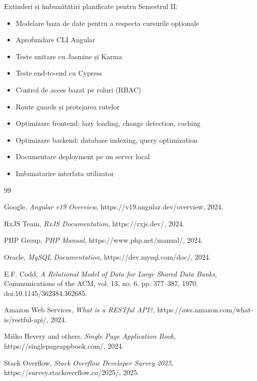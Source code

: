 \documentclass[conference]{IEEEtran}
\begin{document}
Extinderi și îmbunătățiri planificate pentru Semestrul II:

\begin{itemize}
    \item Modelare baza de date pentru a respecta cursurile opționale
    \item Aprofundare CLI Angular
    \item Teste unitare cu Jasmine și Karma
    \item Teste end-to-end cu Cypress
    \item Control de acces bazat pe roluri (RBAC)
    \item Route guards și protejarea rutelor
    \item Optimizare frontend: lazy loading, change detection, caching
    \item Optimizare backend: database indexing, query optimization
    \item Documentare deployment pe un server local
    \item Imbunatarire interfata utilizator
\end{itemize}
\begin{thebibliography}{99}

    Google, \textit{Angular v19 Overview}, https://v19.angular.dev/overview, 2024.

    RxJS Team, \textit{RxJS Documentation}, https://rxjs.dev/, 2024.

    PHP Group, \textit{PHP Manual}, https://www.php.net/manual/, 2024.

    Oracle, \textit{MySQL Documentation}, https://dev.mysql.com/doc/, 2024.

    E.F. Codd, \textit{A Relational Model of Data for Large Shared Data Banks},
    Communications of the ACM, vol. 13, no. 6, pp. 377--387, 1970.
    doi:10.1145/362384.362685.

    Amazon Web Services, \textit{What is a RESTful API?},
    https://aws.amazon.com/what-is/restful-api/, 2024.

    Miško Hevery and others, \textit{Single Page Application Book},
    https://singlepageappbook.com/, 2024.

    Stack Overflow, \textit{Stack Overflow Developer Survey 2025}, https://survey.stackoverflow.co/2025/, 2025.

\end{thebibliography}
\end{document}
